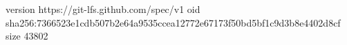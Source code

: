 version https://git-lfs.github.com/spec/v1
oid sha256:7366523e1cdb507b2e64a9535ccea12772e67173f50bd5bf1c9d3b8e4402d8cf
size 43802
